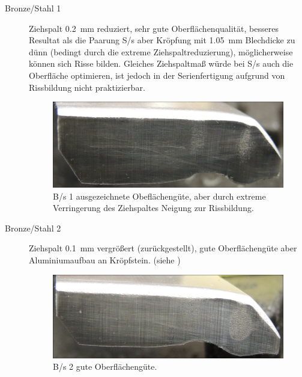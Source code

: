 \documentclass[12pt,a4paper,parskip,twoside,BCOR5mm,headsepline]{scrartcl}
\begin{document}
\begin{description*}
\begin{description}
\item[Bronze/Stahl 1] Ziehspalt \SI{0.2}{\milli\meter} reduziert, sehr gute Oberflächenqualität, besseres Resultat als die Paarung  S/s aber Kröpfung mit \SI{1.05}{\milli\meter} Blechdicke zu dünn (bedingt durch die extreme Ziehspaltreduzierung),  möglicherweise können sich Risse bilden. Gleiches Ziehspaltmaß würde bei S/s auch die Oberfläche optimieren, ist  jedoch in der Serienfertigung aufgrund von Rissbildung nicht praktizierbar.
\begin{figure}[H]
\centering
\includegraphics[width=.8\textwidth]{Bs1a}
\caption{B/s 1 ausgezeichnete Obeflächengüte, aber durch extreme Verringerung des Ziehspaltes Neigung zur Rissbildung.}
\label{fig:Bs1a}
\end{figure}

\item[Bronze/Stahl 2] Ziehspalt \SI{0.1}{\milli\meter} vergrößert (zurückgestellt), gute Oberflächengüte aber Aluminiumaufbau an Kröpfstein. (siehe )
\begin{figure}[H]
\centering
\includegraphics[width=.8\textwidth]{Bs2}
\caption{B/s 2 gute Oberflächengüte.}
\label{fig:Bs2}
\end{figure}
\newpage


\end{description}
\end{description*}
\end{document}
